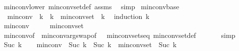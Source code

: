 \begin{isabellebody}
\ min{\isacharunderscore}{\kern0pt}conv{\isacharunderscore}{\kern0pt}lower\ min{\isacharunderscore}{\kern0pt}conv{\isacharunderscore}{\kern0pt}set{\isacharunderscore}{\kern0pt}def\ assms\ \isamarkupfalse%
\ simp\isanewline
{}\isamarkupfalse%
%
\endisatagproof
{\isafoldproof}%
%
\isadelimproof
\isanewline
%
\endisadelimproof
\isanewline
{}\isamarkupfalse%
\ min{\isacharunderscore}{\kern0pt}conv{\isacharunderscore}{\kern0pt}base{\isacharcolon}{\kern0pt}\isanewline
\ \ {\isachardoublequoteopen}min{\isacharunderscore}{\kern0pt}conv\ {}\ k\ {\isacharequal}{\kern0pt}\ k\ {\isasymand}\ min{\isacharunderscore}{\kern0pt}conv{\isacharunderscore}{\kern0pt}set\ {}\ k\ {\isasymnoteq}\ {\isacharbraceleft}{\kern0pt}{\isacharbraceright}{\kern0pt}{\isachardoublequoteclose}\isanewline
%
\isadelimproof
%
\endisadelimproof
%
\isatagproof
{}\isamarkupfalse%
{\isacharparenleft}{\kern0pt}induction\ k{\isacharparenright}{\kern0pt}\isanewline
\ \ \isamarkupfalse%
\ {}\isanewline
\ \ \isamarkupfalse%
\ {\isachardoublequoteopen}min{\isacharunderscore}{\kern0pt}conv\ {}\ {}\ {\isacharequal}{\kern0pt}\ {}\ {\isasymand}\ min{\isacharunderscore}{\kern0pt}conv{\isacharunderscore}{\kern0pt}set\ {}\ {}\ {\isasymnoteq}\ {\isacharbraceleft}{\kern0pt}{\isacharbraceright}{\kern0pt}{\isachardoublequoteclose}\isanewline
\ \ \ \ \isamarkupfalse%
\ min{\isacharunderscore}{\kern0pt}conv{\isacharunderscore}{\kern0pt}{}{\isacharbrackleft}{\kern0pt}of\ {\isachardoublequoteopen}{}{\isachardoublequoteclose}{\isacharbrackright}{\kern0pt}\ min{\isacharunderscore}{\kern0pt}conv{\isacharunderscore}{\kern0pt}arg{\isacharunderscore}{\kern0pt}swap{\isacharbrackleft}{\kern0pt}of\ {\isachardoublequoteopen}{}{\isachardoublequoteclose}\ {\isachardoublequoteopen}{}{\isachardoublequoteclose}{\isacharbrackright}{\kern0pt}\ min{\isacharunderscore}{\kern0pt}conv{\isacharunderscore}{\kern0pt}sets{\isacharunderscore}{\kern0pt}eq\ min{\isacharunderscore}{\kern0pt}conv{\isacharunderscore}{\kern0pt}set{\isacharunderscore}{\kern0pt}def\ \isanewline
\ \ \ \ \isamarkupfalse%
\ simp\isanewline
{}\isamarkupfalse%
\isanewline
\ \ \isamarkupfalse%
\ {\isacharparenleft}{\kern0pt}Suc\ k{\isacharparenright}{\kern0pt}\isanewline
\ \ \isamarkupfalse%
\ {\isachardoublequoteopen}min{\isacharunderscore}{\kern0pt}conv\ {}\ {\isacharparenleft}{\kern0pt}Suc\ k{\isacharparenright}{\kern0pt}\ {\isasymle}\ Suc\ k\ {\isasymand}\ min{\isacharunderscore}{\kern0pt}conv{\isacharunderscore}{\kern0pt}set\ {}\ {\isacharparenleft}{\kern0pt}Suc\ k{\isacharparenright}{\kern0pt}\ {\isasymnoteq}\ {\isacharbraceleft}{\kern0pt}{\isacharbraceright}{\kern0pt}{\isachardoublequoteclose}\isanewline

\end{isabellebody}
